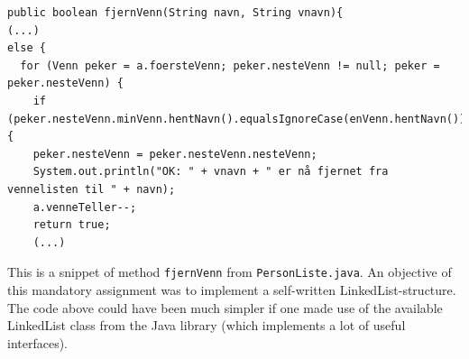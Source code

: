 \documentclass{article}
\begin{document}
\begin{verbatim}
public boolean fjernVenn(String navn, String vnavn){
(...)
else {
  for (Venn peker = a.foersteVenn; peker.nesteVenn != null; peker = peker.nesteVenn) {
    if (peker.nesteVenn.minVenn.hentNavn().equalsIgnoreCase(enVenn.hentNavn())) {
    peker.nesteVenn = peker.nesteVenn.nesteVenn;
    System.out.println("OK: " + vnavn + " er nå fjernet fra vennelisten til " + navn);
    a.venneTeller--;
    return true;
    (...)
\end{verbatim}

This is a snippet of method \texttt{fjernVenn} from \texttt{PersonListe.java}. An objective of this mandatory assignment was to 
implement a self-written LinkedList-structure. The code above could have been much simpler if one made use of the available LinkedList class from 
the Java library (which implements a lot of useful interfaces). 
\end{document}
